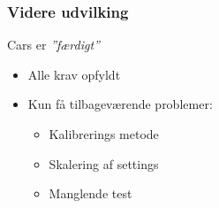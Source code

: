 \begin{frame}
\frametitle{Videre udvilking}
Cars er \textit{''færdigt''}
\begin{itemize}
\item Alle krav opfyldt
\item Kun få tilbageværende problemer:
\begin{itemize}
\item Kalibrerings metode
\item Skalering af settings
\item Manglende test
\end{itemize}
\end{itemize}
\end{frame}